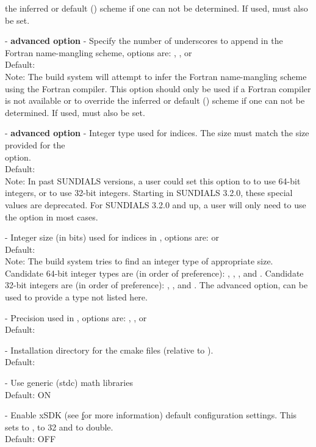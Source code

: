 \begin{description}
  the inferred or default () scheme if one can not be
  determined. If used,  must also
  be set.
\item[\id{SUNDIALS\_F77\_FUNC\_UNDERSCORES}] - \textbf{advanced option} -
  Specify the number of underscores to append in the Fortran
  name-mangling scheme, options are: , , or 
  \\
  Default:
  \\
  Note: The build system will attempt to infer the Fortran
  name-mangling scheme using the Fortran compiler. This option should
  only be used if a Fortran compiler is not available or to override
  the inferred or default () scheme if one can not be
  determined. If used,  must also be set.
\item[\id{SUNDIALS\_INDEX\_TYPE}] - \textbf{advanced option} -
  Integer type used for {\sundials} indices. The size must match the size provided for
  the \\ \noindent {} option.
  \\
  Default:
  \\
  Note:
  In past SUNDIALS versions, a user could set this option to  to use 64-bit
  integers, or  to use 32-bit integers. Starting in SUNDIALS 3.2.0, these
  special values are deprecated. For SUNDIALS 3.2.0 and up, a user will only need to use
  the  option in most cases.
\item[\id{SUNDIALS\_INDEX\_SIZE}] -
  Integer size (in bits) used for indices in {\sundials}, options are:  or 
  \\
  Default: 
  \\
  Note:
  The build system tries to find an integer type of appropriate size. Candidate 64-bit
  integer types are (in order of preference): , , , and .
  Candidate 32-bit integers are (in order of preference): , , and .
  The advanced option,  can be used to provide a type not listed here.
\item[\id{SUNDIALS\_PRECISION}] -
  Precision used in {\sundials}, options are: , , or 
  \\
  Default: 
\item[\id{SUNDIALS\_INSTALL\_CMAKEDIR}] -
  Installation directory for the {\sundials} cmake files (relative to ).
  \\
  Default: 
\item[\id{USE\_GENERIC\_MATH}] -
  Use generic (stdc) math libraries
  \\
  Default: ON
\item[\id{USE\_XSDK\_DEFAULTS}] -
  Enable xSDK (see \href{https://xsdk.info} for more information) default
  configuration settings. This sets  to ,
   to 32 and  to double.
  \\
  Default: OFF
\end{description}
